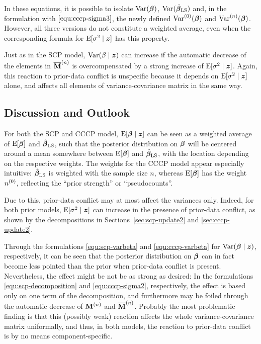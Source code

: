 In these equations, it is possible to isolate $\operatorname{Var}(\boldsymbol{\beta})$, $\operatorname{Var}(\hat{\boldsymbol{\beta}}_\text{LS})$ and,
in the formulation with $\eqref{equ:cccp-sigma3}$, the newly defined
$\operatorname{Var}^{(0)}(\boldsymbol{\beta})$ and $\operatorname{Var}^{(n)}(\boldsymbol{\beta})$.
However, all three versions do not constitute a weighted average,
even when the corresponding formula for $\operatorname{E}[\sigma^2\mid {\bm z}]$ has this property.

Just as in the SCP model, $\operatorname{Var}(\beta\mid {\bm z})$ can increase if the automatic decrease of the elements
in $\overline{\mathbf{M}}^{(n)}$ is overcompensated by a strong increase of $\operatorname{E}[\sigma^2\mid{\bm z}]$.
Again, this reaction to prior-data conflict is unspecific
because it depends on $\operatorname{E}[\sigma^2\mid {\bm z}]$ alone,
and affects all elements of variance-covariance matrix in the same way.


\subsection{Discussion and Outlook}
\label{sec:discussion-festschrift}


For both the SCP and CCCP model, $\operatorname{E}[\boldsymbol{\beta}\mid {\bm z}]$ can be seen as a weighted average
of $\operatorname{E}[\boldsymbol{\beta}]$ and $\hat{\boldsymbol{\beta}}_\text{LS}$, such that the posterior distribution on $\boldsymbol{\beta}$ will be
centered around a mean somewhere between $\operatorname{E}[\boldsymbol{\beta}]$ and $\hat{\boldsymbol{\beta}}_\text{LS}$, with the location
depending on the respective weights. The weights for the CCCP model appear especially intuitive:
$\hat{\boldsymbol{\beta}}_\text{LS}$ is weighted with the sample size $n$, whereas $\operatorname{E}[\boldsymbol{\beta}]$ has the weight $n^{(0)}$,
reflecting the ``prior strength'' or ``pseudocounts''.

Due to this, prior-data conflict may at most affect the variances only. Indeed, for both prior models,
$\operatorname{E}[\sigma^2\mid {\bm z}]$ can increase in the presence of prior-data conflict, as shown by the decompositions
in Sections~\ref{sec:scp-update2} and \ref{sec:cccp-update2}.

Through the formulations \eqref{equ:scp-varbeta} and \eqref{equ:cccp-varbeta} for $\operatorname{Var}(\boldsymbol{\beta}\mid {\bm z})$,
respectively, it can be seen that the posterior distribution on $\boldsymbol{\beta}$ can in fact
become less pointed than the prior when prior-data conflict is present.
Nevertheless, the effect might be not be as strong as desired: In the formulations
\eqref{equ:scp-decomposition} and \eqref{equ:cccp-sigma2}, respectively, the effect is based only on one term of the decomposition,
and furthermore may be foiled through the automatic decrease of $\mathbf{M}^{(n)}$ and $\overline{\mathbf{M}}^{(n)}$.
Probably the most problematic finding is that this (possibly weak) reaction affects the whole
variance-covariance matrix uniformally, and thus, in both models, the reaction
to prior-data conflict is by no means component-specific.

